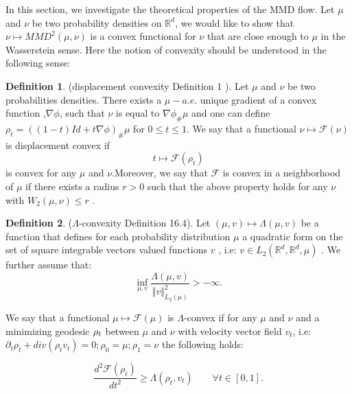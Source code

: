 \documentclass{article}
\newcommand{\1}{\mathbbm 1}
\theoremstyle{definition}
\newtheorem{definition}{Definition}
\begin{document}
In this section, we investigate the theoretical properties of the MMD flow. Let $\mu$ and $\nu$ be two probability densities on $\mathbb{R}^{d}$,
we would like to show that $\nu\mapsto MMD^{2}(\mu,\nu)$ is a convex
functional for $\nu$ that are close enough to $\mu$ in the Wasserstein
sense. Here the notion of convexity should be understood in the following
sense:
\begin{definition}
(displacement convexity \cite{Villani:2004} Definition 1 ). Let $\mu$
and $\nu$ be two probabilities densities. There exists a $\mu-a.e.$
unique gradient of a convex function ,$\nabla\phi$, such that $\nu$
is equal to $\nabla\phi_{\#}\mu$ and one can define $\rho_{t}=((1-t)Id+t\nabla\phi)_{\#}\mu$
for $0\leq t\leq1$. We say that a functional $\nu\mapsto\mathcal{F}(\nu)$
is displacement convex if 
\[
t\mapsto\mathcal{F}(\rho_{t})
\]
 is convex for any $\mu$ and $\nu$.Moreover, we say that $\mathcal{F}$
is convex in a neighborhood of $\mu$ if there exists a radius $r>0$
such that the above property holds for any $\nu$ with $W_{2}(\mu,\nu)\leq r$
.
\end{definition}
%
\begin{definition}
($\Lambda$-convexity \cite{Villani:2009} Definition 16.4). Let $(\mu,v)\mapsto\Lambda(\mu,v)$
be a function that defines for each probability distribution $\mu$
a quadratic form on the set of square integrable vectors valued functions
$v$ , i.e: $v\in L_{2}(\mathbb{R}^{d},\mathbb{R}^{d},\mu)$ . We
further assume that:
\[
\inf_{\mu,v}\frac{\Lambda(\mu,v)}{\Vert v\Vert_{L_{2}(\mu)}^{2}}>-\infty.
\]

We say that a functional $\mu\mapsto\mathcal{F}(\mu)$ is $\Lambda$-convex
if for any $\mu$ and $\nu$ and a minimizing geodesic $\text{\ensuremath{\rho_{t}}}$
between $\mu$ and $\nu$ with velocity vector field $v_{t}$, i.e:
$\partial_{t}\rho_{t}+div(\rho_{t}v_{t})=0;\rho_{0}=\mu;\rho_{1}=\nu$
the following holds:
\end{definition}
\[
\frac{d^{2}\mathcal{F}(\rho_{t})}{dt^{2}}\geq\Lambda(\rho_{t},v_{t})\qquad\forall t\in[0,1].
\]
\end{document}
